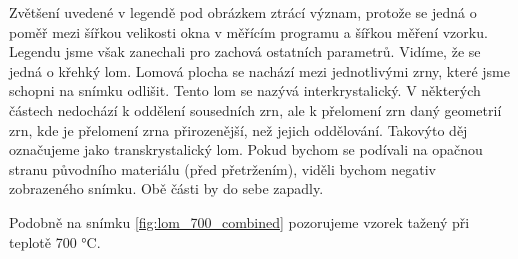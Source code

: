 Zvětšení uvedené v legendě pod obrázkem ztrácí význam, protože se jedná o poměř mezi šířkou velikosti okna v měřícím programu a šířkou měření vzorku. Legendu jsme však zanechali pro zachová ostatních parametrů. Vidíme, že se jedná o křehký lom. Lomová plocha se nachází mezi jednotlivými zrny, které jsme schopni na snímku odlišit. Tento lom se nazývá interkrystalický. V některých částech nedochází k oddělení sousedních zrn, ale k přelomení zrn daný geometrií zrn, kde je přelomení zrna přirozenější, než jejich oddělování. Takovýto děj označujeme jako transkrystalický lom. Pokud bychom se podívali na opačnou stranu původního materiálu (před přetržením), viděli bychom negativ zobrazeného snímku. Obě části by do sebe zapadly.

Podobně na snímku \ref{fig:lom_700_combined} pozorujeme vzorek tažený při teplotě 700 °C.

